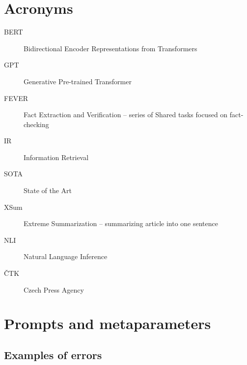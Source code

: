 \documentclass[oneside]{ctuthesis}
\theoremstyle{plain}
\theoremstyle{definition}
\theoremstyle{note}
\begin{document}
\maketitle









%


\appendix
%
\chapter{Acronyms}
\begin{description}
\item[BERT] Bidirectional Encoder Representations from Transformers
\item[GPT] Generative Pre-trained Transformer 
\item[FEVER] Fact Extraction and Verification -- series of Shared tasks focused on fact-checking
\item[IR] Information Retrieval
\item[SOTA] State of the Art
\item[XSum] Extreme Summarization -- summarizing article into one sentence
\item[NLI] Natural Language Inference
\item[ČTK] Czech Press Agency
\end{description}

\chapter{Prompts and metaparameters}
\section{Examples of errors}
\label{appendix_sec:errors}
\end{document}

